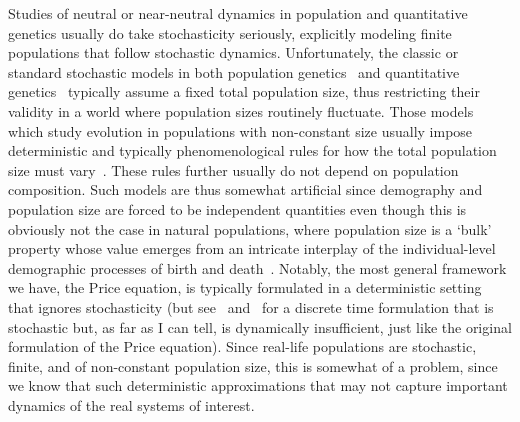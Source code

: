 Studies of neutral or near-neutral dynamics in population and quantitative genetics usually do take stochasticity seriously, explicitly modeling finite populations that follow stochastic dynamics. Unfortunately, the classic or standard stochastic models in both population genetics~\citep{fisher_genetical_1930,wright_evolution_1931, moran_random_1958, kimura_diffusion_1964} and quantitative genetics~\citep{crow_introduction_1970, lande_natural_1976} typically assume a fixed total population size, thus restricting their validity in a world where population sizes routinely fluctuate. Those models which study evolution in populations with non-constant size usually impose deterministic and typically phenomenological rules for how the total population size must vary~\citep{kimura_probability_1974,ewens_probability_1967,otto_probability_1997, engen_fixation_2009, waxman_unified_2011}. These rules further usually do not depend on population composition. Such models are thus somewhat artificial since demography and population size are forced to be independent quantities even though this is obviously not the case in natural populations, where population size is a `bulk' property whose value emerges from an intricate interplay of the individual-level demographic processes of birth and death~\citep{metcalf_why_2007,doebeli_towards_2017}. Notably, the most general framework we have, the Price equation, is typically formulated in a deterministic setting ~\citep{page_unifying_2002,frank_natural_2012,queller_fundamental_2017,lion_theoretical_2018,day_price_2020} that ignores stochasticity (but see~\citet{rice_stochastic_2008} and~\citet{rice_universal_2020} for a discrete time formulation that is stochastic but, as far as I can tell, is dynamically insufficient, just like the original formulation of the Price equation). Since real-life populations are stochastic, finite, and of non-constant population size, this is somewhat of a problem, since we know that such deterministic approximations that may not capture important dynamics of the real systems of interest.

